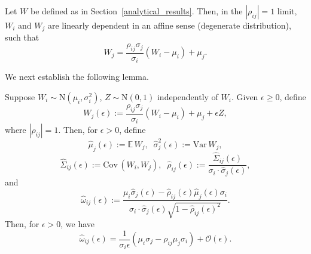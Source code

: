 \documentclass{article}
\begin{document}
\begin{lemma}
\label{rho_pm1_lem}
Let $W$ be defined as in Section~\ref{analytical_results}. Then, in the $|\rho_{ij}|=1$ limit, $W_i$ and $W_j$ are linearly dependent in an affine sense (degenerate distribution), such that  
\begin{equation}\label{W_result}
W_j=\frac{\rho_{ij}\sigma_j}{\sigma_i}(W_i-\mu_i)+\mu_j.
\end{equation}
\end{lemma}

We next establish the following lemma.

\begin{lemma}\label{epsilon_lem}
Suppose $W_i\sim\mathrm{N}(\mu_i,\sigma_i^2)$, $Z\sim\mathrm{N}(0,1)$ independently of $W_i$. Given $\epsilon\geq 0$, define \begin{equation}\label{Wj_def}
W_j(\epsilon):=\frac{\rho_{ij}\sigma_j}{\sigma_i}(W_i-\mu_i)+\mu_j+\epsilon Z,
\end{equation}
where $|\rho_{ij}|=1$. Then, for $\epsilon>0$, define
\begin{equation}\label{muj_sigmaj_def}
\hat{\mu}_j(\epsilon):=\mathbb{E}\,W_j,\;\;\hat{\sigma}_j^2(\epsilon):=\mathrm{Var}\,W_j,
\end{equation}
\begin{equation}\label{Sigmaij_rhoij_def}
\hat{\Sigma}_{ij}(\epsilon):=\mathrm{Cov}\,(W_i,W_j),\;\;\hat{\rho}_{ij}(\epsilon):=\frac{\hat{\Sigma}_{ij}(\epsilon)}{\sigma_i\cdot\hat{\sigma}_j(\epsilon)},
\end{equation}
and
\begin{equation}\label{omegaij_def}
\hat{\omega}_{ij}(\epsilon):=\frac{\mu_i\hat{\sigma}_j(\epsilon) - \hat{\rho}_{ij}(\epsilon) \hat{\mu}_j(\epsilon)\sigma_i}{\sigma_i\cdot\hat{\sigma}_j(\epsilon)\sqrt{1 - \hat{\rho}_{ij}(\epsilon)^2}}.
\end{equation}
Then, for $\epsilon>0$, we have
\begin{equation}\label{lem_result}
\hat{\omega}_{ij}(\epsilon)=\frac{1}{\sigma_i\epsilon}(\mu_i\sigma_j-\rho_{ij}\mu_j\sigma_i)+\mathcal{O}(\epsilon).
\end{equation}
\end{lemma}
\end{document}
